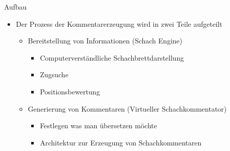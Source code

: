 \begin{frame}{Aufbau}
\begin{itemize}
	\item Der Prozess der Kommentarerzeugung wird in zwei Teile aufgeteilt
	\begin{itemize}
		\item Bereitstellung von Informationen (Schach Engine)
		\begin{itemize}
			\item Computerverständliche Schachbrettdarstellung
			\item Zugsuche
			\item Positionsbewertung
		\end{itemize}
		\item Generierung von Kommentaren (Virtueller Schachkommentator)
		\begin{itemize}
			\item Festlegen was man übersetzen möchte
			\item Architektur zur Erzeugung von Schachkommentaren
		\end{itemize}
	\end{itemize}
\end{itemize}
\end{frame}
